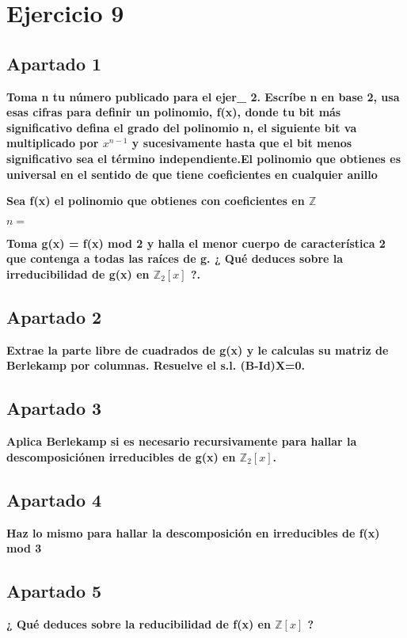 \documentclass[a4paper]{article}
\title {\fbox{\Huge{\textbf{Ejercicio 9}}}}
\author {\fbox{Ana Buendía Ruiz-Azuaga}}
\begin{document}
\maketitle


\section{Ejercicio 9}

\subsection{Apartado 1}

\textbf{Toma n tu número publicado para el ejer_ 2. Escríbe n en base 2, usa esas cifras para definir un polinomio, f(x), donde tu bit más significativo defina el grado del polinomio n, el siguiente bit va multiplicado por $x^{n-1}$ y sucesivamente hasta que el bit menos significativo sea el término independiente.El polinomio que obtienes es universal en el sentido de que tiene coeficientes en cualquier anillo}

\textbf{Sea f(x) el polinomio que obtienes con coeficientes en $\mathbb{Z}$}

$n = $

\textbf{Toma g(x) = f(x) mod 2 y halla el menor cuerpo de característica 2 que contenga a todas las raíces de g. ¿ Qué deduces sobre la irreducibilidad de g(x) en $\mathbb{Z}_2[x]$ ?.}

\subsection{Apartado 2}
\textbf{Extrae la parte libre de cuadrados de g(x) y le calculas su matriz de Berlekamp por columnas. Resuelve el s.l. (B-Id)X=0.}



\subsection{Apartado 3}
\textbf{Aplica Berlekamp si es necesario recursivamente para hallar la descomposiciónen irreducibles de g(x) en $\mathbb{Z}_2[x]$.}



\subsection{Apartado 4}
\textbf{Haz lo mismo para hallar la descomposición en irreducibles de f(x) mod 3}



\subsection{Apartado 5}
\textbf{¿ Qué deduces sobre la reducibilidad de f(x) en $\mathbb{Z}[x]$ ?}
\end{document}
